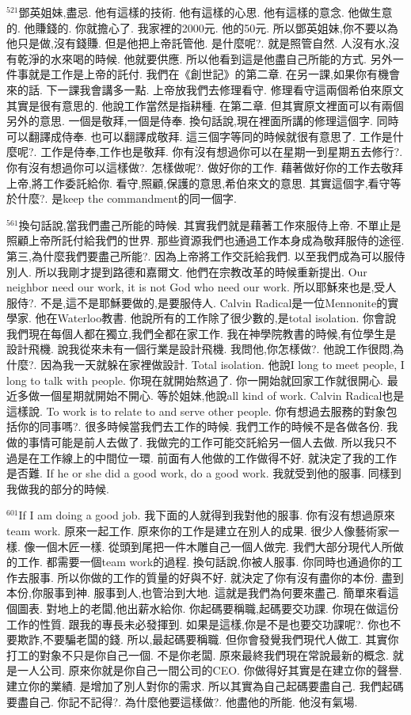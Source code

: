 \documentclass{book}
\begin{document}
$^{521}$鄧英姐妹,盡忌.
他有這樣的技術.
他有這樣的心思.
他有這樣的意念.
他做生意的.
他賺錢的.
你就擔心了.
我家裡的2000元.
他的50元.
所以鄧英姐妹,你不要以為他只是做,沒有錢賺.
但是他把上帝託管他.
是什麼呢?.
就是照管自然.
人沒有水,沒有乾淨的水來喝的時候.
他就要供應.
所以他看到這是他盡自己所能的方式.
另外一件事就是工作是上帝的託付.
我們在《創世記》的第二章.
在另一課,如果你有機會來的話.
下一課我會講多一點.
上帝放我們去修理看守.
修理看守這兩個希伯來原文其實是很有意思的.
他說工作當然是指耕種.
在第二章.
但其實原文裡面可以有兩個另外的意思.
一個是敬拜,一個是侍奉.
換句話說,現在裡面所講的修理這個字.
同時可以翻譯成侍奉.
也可以翻譯成敬拜.
這三個字等同的時候就很有意思了.
工作是什麼呢?.
工作是侍奉,工作也是敬拜.
你有沒有想過你可以在星期一到星期五去修行?.
你有沒有想過你可以這樣做?.
怎樣做呢?.
做好你的工作.
藉著做好你的工作去敬拜上帝,將工作委託給你.
看守,照顧,保護的意思,希伯來文的意思.
其實這個字,看守等於什麼?.
是keep the commandment的同一個字.

$^{561}$換句話說,當我們盡己所能的時候.
其實我們就是藉著工作來服侍上帝.
不單止是照顧上帝所託付給我們的世界.
那些資源我們也通過工作本身成為敬拜服侍的途徑.
第三,為什麼我們要盡己所能?.
因為上帝將工作交託給我們.
以至我們成為可以服侍別人.
所以我剛才提到路德和嘉爾文.
他們在宗教改革的時候重新提出.
Our neighbor need our work, it is not God who need our work.
所以耶穌來也是,受人服侍?.
不是,這不是耶穌要做的,是要服侍人.
Calvin Radical是一位Mennonite的實學家.
他在Waterloo教書.
他說所有的工作除了很少數的,是total isolation.
你會說我們現在每個人都在獨立,我們全都在家工作.
我在神學院教書的時候,有位學生是設計飛機.
說我從來未有一個行業是設計飛機.
我問他,你怎樣做?.
他說工作很悶,為什麼?.
因為我一天就躲在家裡做設計.
Total isolation.
他說I long to meet people, I long to talk with people.
你現在就開始熬過了.
你一開始就回家工作就很開心.
最近多做一個星期就開始不開心.
等於姐妹,他說all kind of work.
Calvin Radical也是這樣說.
To work is to relate to and serve other people.
你有想過去服務的對象包括你的同事嗎?.
很多時候當我們去工作的時候.
我們工作的時候不是各做各份.
我做的事情可能是前人去做了.
我做完的工作可能交託給另一個人去做.
所以我只不過是在工作線上的中間位一環.
前面有人他做的工作做得不好.
就決定了我的工作是否難.
If he or she did a good work, do a good work.
我就受到他的服事.
同樣到我做我的部分的時候.

$^{601}$If I am doing a good job.
我下面的人就得到我對他的服事.
你有沒有想過原來team work.
原來一起工作.
原來你的工作是建立在別人的成果.
很少人像藝術家一樣.
像一個木匠一樣.
從頭到尾把一件木雕自己一個人做完.
我們大部分現代人所做的工作.
都需要一個team work的過程.
換句話說,你被人服事.
你同時也通過你的工作去服事.
所以你做的工作的質量的好與不好.
就決定了你有沒有盡你的本份.
盡到本份,你服事到神.
服事到人,也管治到大地.
這就是我們為何要來盡己.
簡單來看這個圖表.
對地上的老闆,他出薪水給你.
你起碼要稱職,起碼要交功課.
你現在做這份工作的性質.
跟我的專長未必發揮到.
如果是這樣,你是不是也要交功課呢?.
你也不要欺詐,不要騙老闆的錢.
所以,最起碼要稱職.
但你會發覺我們現代人做工.
其實你打工的對象不只是你自己一個.
不是你老闆.
原來最終我們現在常說最新的概念.
就是一人公司.
原來你就是你自己一間公司的CEO.
你做得好其實是在建立你的聲譽.
建立你的業績.
是增加了別人對你的需求.
所以其實為自己起碼要盡自己.
我們起碼要盡自己.
你記不記得?.
為什麼他要這樣做?.
他盡他的所能.
他沒有氣場.
\end{document}
